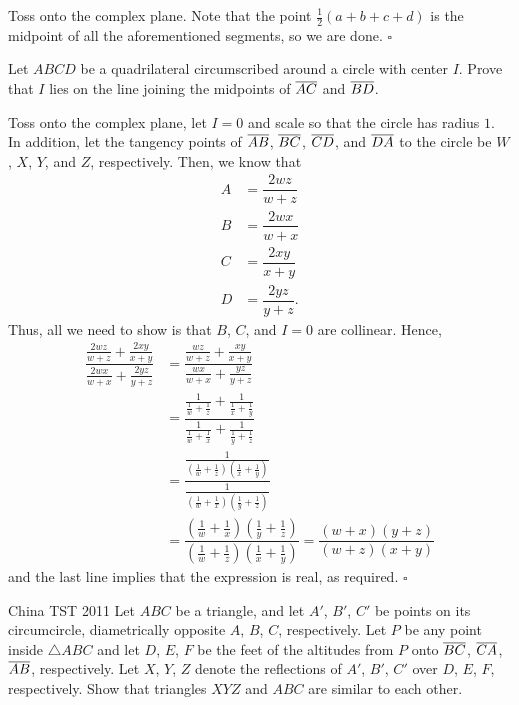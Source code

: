 \documentclass{article}
\begin{document}
Toss onto the complex plane. Note that the point $\tfrac{1}{2}(a+b+c+d)$ is the midpoint of all the aforementioned segments, so we are done. $\square$

\begin{problem}[6.32]{}
Let $ABCD$ be a quadrilateral circumscribed around a circle with center $I$. Prove that $I$ lies on the line joining the midpoints of $\overline{AC}$ and $\overline{BD}$.
\end{problem}

Toss onto the complex plane, let $I = 0$ and scale so that the circle has radius $1$. In addition, let the tangency points of $\overline{AB}$, $\overline{BC}$, $\overline{CD}$, and $\overline{DA}$ to the circle be $W$, $X$, $Y$, and $Z$, respectively. Then, we know that 
\begin{align*}
A &= \dfrac{2wz}{w+z} \\
B &= \dfrac{2wx}{w+x} \\
C &= \dfrac{2xy}{x+y} \\
D &= \dfrac{2yz}{y+z}.
\end{align*}
Thus, all we need to show is that $B$, $C$, and $I = 0$ are collinear. Hence,
\begin{align*}
\dfrac{\tfrac{2wz}{w+z}+\tfrac{2xy}{x+y}}{\tfrac{2wx}{w+x}+\tfrac{2yz}{y+z}} &= \dfrac{\tfrac{wz}{w+z}+\tfrac{xy}{x+y}}{\tfrac{wx}{w+x}+\tfrac{yz}{y+z}} \\
&= \dfrac{\tfrac{1}{\tfrac{1}{w}+\tfrac{1}{z}}+\tfrac{1}{\tfrac{1}{x}+\tfrac{1}{y}}}{\tfrac{1}{\tfrac{1}{w}+\tfrac{1}{x}}+\tfrac{1}{\tfrac{1}{y}+\tfrac{1}{z}}} \\
&= \dfrac{\tfrac{1}{\left(\tfrac{1}{w}+\tfrac{1}{z}\right)\left(\tfrac{1}{x}+\tfrac{1}{y}\right)}}{\tfrac{1}{\left(\tfrac{1}{w}+\tfrac{1}{x}\right)\left(\tfrac{1}{y}+\tfrac{1}{z}\right)}} \\
&= \dfrac{\left(\tfrac{1}{w}+\tfrac{1}{x}\right)\left(\tfrac{1}{y}+\tfrac{1}{z}\right)}{\left(\tfrac{1}{w}+\tfrac{1}{z}\right)\left(\tfrac{1}{x}+\tfrac{1}{y}\right)} = \dfrac{(w+x)(y+z)}{(w+z)(x+y)}
\end{align*}
and the last line implies that the expression is real, as required. $\square$

\begin{problem}[6.33]{China TST 2011}
Let $ABC$ be a triangle, and let $A'$, $B'$, $C'$ be points on its circumcircle, diametrically opposite $A$, $B$, $C$, respectively. Let $P$ be any point inside $\triangle ABC$ and let $D$, $E$, $F$ be the feet of the altitudes from $P$ onto $\overline{BC}$, $\overline{CA}$, $\overline{AB}$, respectively. Let $X$, $Y$, $Z$ denote the reflections of $A'$, $B'$, $C'$ over $D$, $E$, $F$, respectively. Show that triangles $XYZ$ and $ABC$ are similar to each other.
\end{problem}
\end{document}

